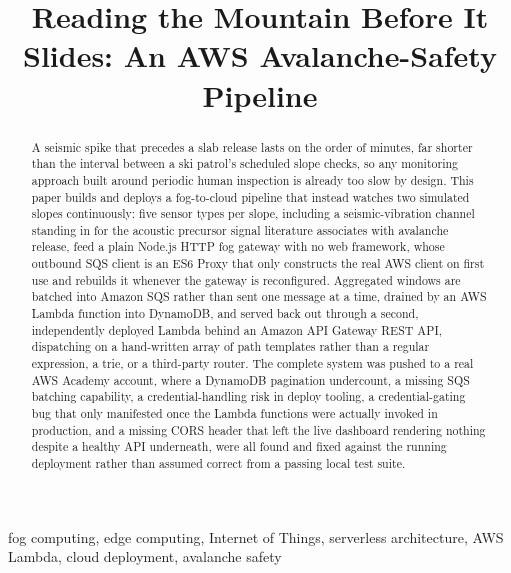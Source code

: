 \documentclass[conference]{IEEEtran}
\begin{document}
\title{Reading the Mountain Before It Slides: An AWS Avalanche-Safety Pipeline}

\author{
}

\maketitle

\begin{abstract}
A seismic spike that precedes a slab release lasts on the order of minutes, far shorter than the interval between a ski patrol's scheduled slope checks, so any monitoring approach built around periodic human inspection is already too slow by design. This paper builds and deploys a fog-to-cloud pipeline that instead watches two simulated slopes continuously: five sensor types per slope, including a seismic-vibration channel standing in for the acoustic precursor signal literature associates with avalanche release, feed a plain Node.js HTTP fog gateway with no web framework, whose outbound SQS client is an ES6 Proxy that only constructs the real AWS client on first use and rebuilds it whenever the gateway is reconfigured. Aggregated windows are batched into Amazon SQS rather than sent one message at a time, drained by an AWS Lambda function into DynamoDB, and served back out through a second, independently deployed Lambda behind an Amazon API Gateway REST API, dispatching on a hand-written array of path templates rather than a regular expression, a trie, or a third-party router. The complete system was pushed to a real AWS Academy account, where a DynamoDB pagination undercount, a missing SQS batching capability, a credential-handling risk in deploy tooling, a credential-gating bug that only manifested once the Lambda functions were actually invoked in production, and a missing CORS header that left the live dashboard rendering nothing despite a healthy API underneath, were all found and fixed against the running deployment rather than assumed correct from a passing local test suite.
\end{abstract}

\begin{IEEEkeywords}
fog computing, edge computing, Internet of Things, serverless architecture, AWS Lambda, cloud deployment, avalanche safety
\end{IEEEkeywords}
\end{document}
